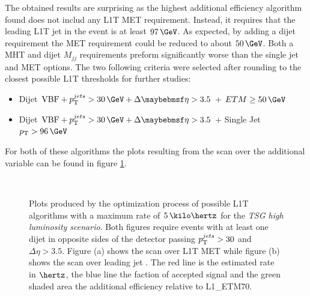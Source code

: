The obtained results are surprising as the highest additional efficiency algorithm found does not includ any \gls{L1T} \gls{MET} requirement. Instead, it requires that the leading \gls{L1T} jet in the event is at least $97\,\GeV$. As expected, by adding a dijet requirement  the \gls{MET} requirement could be reduced to about $50\,\GeV$. Both a \gls{MHT} and dijet $M_{jj}$ requirements preform significantly worse than the single jet and \gls{MET} options. The two following criteria were selected after rounding to the closest possible \gls{L1T} thresholds for further studies:


\begin{itemize}
  \item Dijet $\text{VBF} + \pt^{jets}>30\,\GeV + \Delta\eta>3.5$ + $ETM \geq 50\,\GeV$
  \item Dijet $\text{VBF} + \pt^{jets}>30\,\GeV + \Delta\eta>3.5$ + Single Jet $\pt>96\,\GeV$ 
\end{itemize}

For both of these algorithms the plots resulting from the scan over the additional variable can be found in figure \ref{FIGURE:RunIIPreparation_L1TAlgorithmDevelopment_VariableScan}. 

\begin{figure}[!htp]%
\centering
{}
\\
\caption{Plots produced by the optimization process of possible \gls{L1T} algorithms with a maximum rate of $5\,\kilo\hertz$ for the \textit{\gls{TSG} high luminosity scenario}. Both figures require events with at least one dijet in opposite sides of the detector passing $p_{\mathrm{T}}^{jets}>30$ and $\Delta\eta>3.5$. Figure (a) shows the scan over \gls{L1T} \gls{MET} while figure (b) shows the scan over leading jet \pt. The red line is the estimated rate in $\hertz$, the blue line the faction of accepted signal and the green shaded area the additional efficiency relative to L1\_ETM70.}
\label{FIGURE:RunIIPreparation_L1TAlgorithmDevelopment_VariableScan}
\end{figure}

